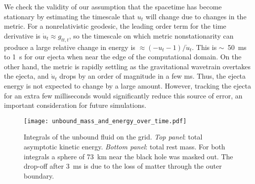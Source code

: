 We check the validity of our assumption that the spacetime has become
stationary by estimating the timescale that $u_t$ will change due to changes
in the metric.  For a nonrelativistic geodesic, the leading order term for
the time derivative is $\dot{u}_t\approx g_{tt,t}$, so the timescale on which
metric nonstationarity can produce a large relative change in energy is
$\approx (-u_t-1)/\dot{u}_t$.  This is $\sim$~50~ms to 1~s for our ejecta
when near the edge of the computational domain.  On the other hand, the
metric is rapidly settling as the gravitational wavetrain overtakes the
ejecta, and $\dot{u}_t$ drops by an order of magnitude in a few ms.  Thus,
the ejecta energy is not expected to change by a large amount.  However,
tracking the ejecta for an extra few milliseconds would significantly
reduce this source of error, an important consideration for future
simulations.

\begin{figure}
\texttt{[image: unbound\_mass\_and\_energy\_over\_time.pdf]}
\caption{
Integrals of the unbound fluid on the grid.
{\em Top panel}: total asymptotic kinetic energy.
{\em Bottom panel}: total rest mass.
For both integrals a sphere of 73~km near the black hole was masked out.
The drop-off after 3~ms is due to the loss of matter through
the outer boundary.
}
\label{fig:ejecta_mass_and_energy}
\end{figure}

